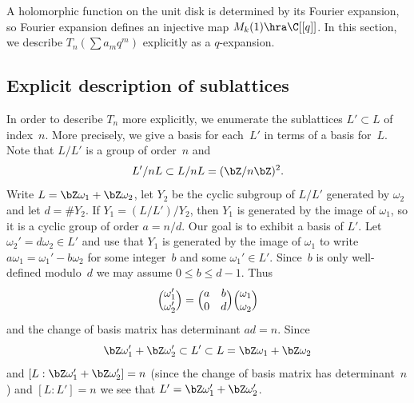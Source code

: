 \documentclass{report}
\begin{document}
A holomorphic function on the unit disk is determined by its Fourier
expansion, so Fourier expansion defines an injective map $M_k(1)\hra
\C[[q]]$.  In this section, we describe $T_n(\sum a_m q^m)$ explicitly
as a $q$-expansion.

\subsection{Explicit description of sublattices}\label{sec:explattice} In order to describe $T_n$ more
explicitly, we enumerate the sublattices $L'\subset L$
of index~$n$.  More precisely, we give a basis for each~$L'$ in
terms of a basis for~$L$.  Note that $L/L'$ is a group of
order~$n$ and
\[
L'/nL \subset L/nL=(\bZ/n\bZ)^2.
\]
Write $L=\bZ\omega_1+\bZ\omega_2$, let $Y_2$ be the cyclic
subgroup of $L/L'$ generated by $\omega_2$ and let $d=\#Y_2$. If
$Y_1=(L/L')/Y_2$, then $Y_1$ is generated by the image of
$\omega_1$, so it is a cyclic group of order $a=n/d$.  Our goal is
to exhibit a basis of $L'$. Let $\omega_2'=d\omega_2\in L'$ and
use that $Y_1$ is generated by the image of $\omega_1$ to write
$a\omega_1=\omega_1'-b\omega_2$ for some integer~$b$ and some
$\omega_1'\in L'$. Since~$b$ is only well-defined modulo~$d$ we
may assume $0\leq b\leq d-1$. Thus
$$
\Bigl(\begin{matrix}\omega_1'\\ \omega_2'\end{matrix}\Bigr)
=
\Bigl(\begin{matrix}a&b\\0&d\end{matrix}\Bigr)
\Bigl(\begin{matrix}\omega_1\\ \omega_2\end{matrix}\Bigr)
$$
and the change of basis matrix has determinant $ad=n$. Since
\[
 \bZ\omega_1'+\bZ\omega_2'\subset L' \subset
  L=\bZ\omega_1+\bZ\omega_2
\]
and $[L:\bZ\omega_1'+\bZ\omega_2']=n$ (since the change of basis
matrix has determinant~$n$) and $[L:L']=n$ we see that
$L'=\bZ\omega_1'+\bZ\omega_2'$.
\end{document}
